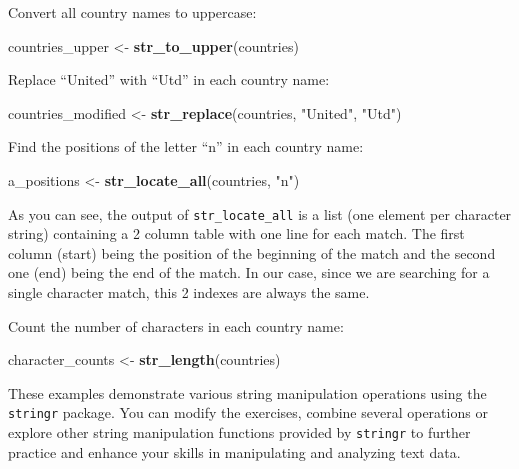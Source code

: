 \documentclass[
]{book}
\newenvironment{Shaded}{\begin{snugshade}}{\end{snugshade}}
\newcommand{\FunctionTok}[1]{\textcolor[rgb]{0.13,0.29,0.53}{\textbf{#1}}}
\newcommand{\NormalTok}[1]{#1}
\newcommand{\OtherTok}[1]{\textcolor[rgb]{0.56,0.35,0.01}{#1}}
\newcommand{\StringTok}[1]{\textcolor[rgb]{0.31,0.60,0.02}{#1}}
\theoremstyle{definition}
\theoremstyle{definition}
\theoremstyle{definition}
\theoremstyle{definition}
\theoremstyle{remark}
\begin{document}
Convert all country names to uppercase:

\begin{Shaded}
\begin{Highlighting}[]
\NormalTok{countries\_upper }\OtherTok{\textless{}{-}} \FunctionTok{str\_to\_upper}\NormalTok{(countries)}
\end{Highlighting}
\end{Shaded}

Replace ``United'' with ``Utd'' in each country name:

\begin{Shaded}
\begin{Highlighting}[]
\NormalTok{countries\_modified }\OtherTok{\textless{}{-}} \FunctionTok{str\_replace}\NormalTok{(countries, }\StringTok{"United"}\NormalTok{, }\StringTok{"Utd"}\NormalTok{)}
\end{Highlighting}
\end{Shaded}

Find the positions of the letter ``n'' in each country name:

\begin{Shaded}
\begin{Highlighting}[]
\NormalTok{a\_positions }\OtherTok{\textless{}{-}} \FunctionTok{str\_locate\_all}\NormalTok{(countries, }\StringTok{"n"}\NormalTok{)}
\end{Highlighting}
\end{Shaded}

As you can see, the output of \texttt{str\_locate\_all} is a list (one element per character string) containing a 2 column table with one line for each match. The first column (start) being the position of the beginning of the match and the second one (end) being the end of the match. In our case, since we are searching for a single character match, this 2 indexes are always the same.

Count the number of characters in each country name:

\begin{Shaded}
\begin{Highlighting}[]
\NormalTok{character\_counts }\OtherTok{\textless{}{-}} \FunctionTok{str\_length}\NormalTok{(countries)}
\end{Highlighting}
\end{Shaded}

These examples demonstrate various string manipulation operations using the \texttt{stringr} package. You can modify the exercises, combine several operations or explore other string manipulation functions provided by \texttt{stringr} to further practice and enhance your skills in manipulating and analyzing text data.
\end{document}
